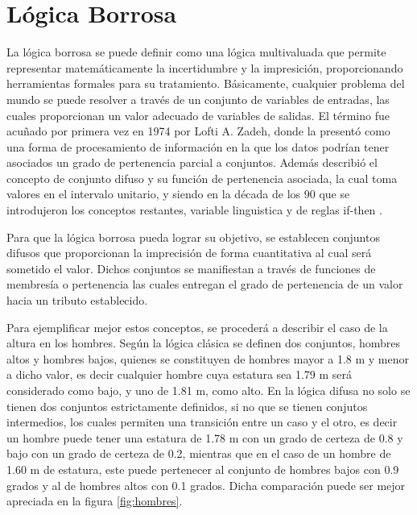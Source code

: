 

\section{Lógica Borrosa}

La lógica borrosa se puede definir como una lógica multivaluada que permite representar matemáticamente la incertidumbre y la impresición, proporcionando herramientas formales para su tratamiento. Básicamente, cualquier problema del mundo se puede resolver a través de un conjunto de variables de entradas, las cuales proporcionan un valor adecuado de variables de salidas. El término fue acuñado por primera vez en 1974 por Lofti A. Zadeh, donde la presentó como una forma de procesamiento de información en la que los datos podrían tener asociados un grado de pertenencia parcial a conjuntos. Además describió el concepto de conjunto difuso y su función de pertenencia asociada, la cual toma valores en el intervalo unitario, y siendo en la década de los 90 que se introdujeron los conceptos restantes, variable linguistica y de reglas if-then \cite{morcillo2011logica}.\\

\par Para que la lógica borrosa pueda lograr su objetivo, se establecen conjuntos difusos que proporcionan la imprecisión de forma cuantitativa al cual será sometido el valor. Dichos conjuntos se manifiestan a través de funciones de membresía o pertenencia las cuales entregan el grado de pertenencia de un valor hacia un tributo establecido.\\

\par Para ejemplificar mejor estos conceptos, se procederá a describir el caso de la altura en los hombres. Según la lógica clásica se definen dos conjuntos, hombres altos y hombres bajos, quienes se constituyen de hombres mayor a 1.8 m y menor a dicho valor, es decir cualquier hombre cuya estatura sea 1.79 m será considerado como bajo, y uno de 1.81 m, como alto. En la lógica difusa no solo se tienen dos conjuntos estrictamente definidos, si no que se tienen conjutos intermedios, los cuales permiten una transición entre un caso y el otro, es decir un hombre puede tener una estatura de 1.78 m con un grado de certeza de 0.8 y bajo con un grado de certeza de 0.2, mientras que en el caso de un hombre de 1.60 m de estatura, este puede pertenecer al conjunto de hombres bajos con 0.9 grados y al de hombres altos con 0.1 grados. Dicha comparación puede ser mejor apreciada en la figura \ref{fig:hombres}.\\

